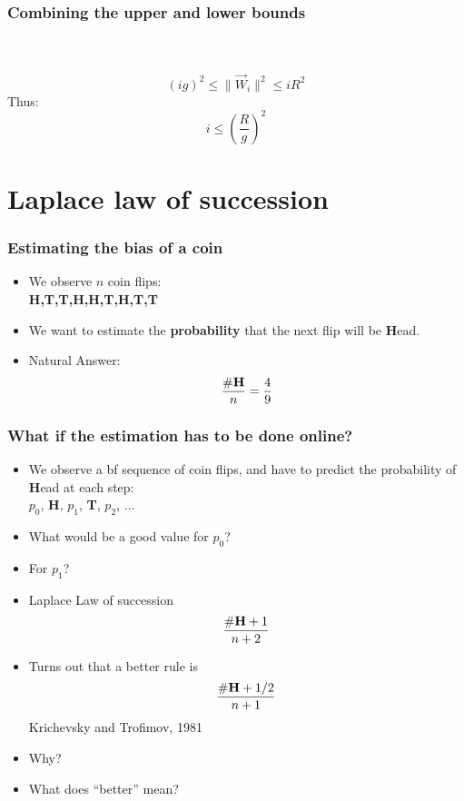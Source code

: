 \documentclass[handout]{beamer}
\newcommand{\W}{\vec{W}}
\begin{document}
\begin{frame}
\frametitle{Combining the upper and lower bounds}
~\\
~\\
\pause
$$(ig)^2 \leq \|\W_i\|^2 \leq i R^2$$
\pause
Thus:
$$ i \leq \left(\frac{R}{g} \right)^2 $$
\end{frame}

\section{Laplace law of succession}

\begin{frame}
\frametitle{Estimating the bias of a coin}

\begin{itemize}
\item We observe $n$ coin flips:\\
{\bf H,T,T,H,H,T,H,T,T}
\item
We want to estimate the {\bf probability} that the next flip will be {\bf H}ead.
\item
Natural Answer:
\[
\frac{\#\mbox{\bf H}}{n} = \frac{4}{9}
\]
\end{itemize}
\end{frame}

\begin{frame}
\frametitle{What if the estimation has to be done online?}

\begin{itemize}
\item We observe a {bf sequence} of coin flips, and have to predict the probability of {\bf H}ead at each step:
\\ $p_0$,\pause 
{\bf H},\pause 
$p_1$,\pause
{\bf T},\pause
$p_2$,\pause 
$\ldots$
\item
What would be a good value for $p_0$?
\item
For $p_1$?
\item
Laplace Law of succession
\[
\frac{\#\mbox{\bf H} +1}{n+2}
\]
\item 
Turns out that a better rule is 
\[
\frac{\#\mbox{\bf H} +1/2}{n+1}
\]
Krichevsky and Trofimov, 1981
\item
Why? 
\item 
What does ``better'' mean?
\end{itemize}
\end{frame}
\end{document}
